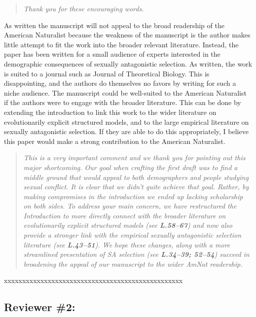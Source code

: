 \documentclass[11pt]{article}
\begin{document}
\begin{quote}
	{\itshape Thank you for these encouraging words.}
\end{quote}

As written the manuscript will not appeal to the broad readership of the American Naturalist because the weakness of the manuscript is the author makes little attempt to fit the work into the broader relevant literature. Instead, the paper has been written for a small audience of experts interested in the demographic consequences of sexually antagonistic selection. As written, the work is suited to a journal such as Journal of Theoretical Biology. This is disappointing, and the authors do themselves no favors by writing for such a niche audience. The manuscript could be well-suited to the American Naturalist if the authors were to engage with the broader literature. This can be done by extending the introduction to link this work to the wider literature on evolutionarily explicit structured models, and to the large empirical literature on sexually antagonistic selection. If they are able to do this appropriately, I believe this paper would make a strong contribution to the American Naturalist.

\begin{quote}
	{\itshape This is a very important comment and we thank you for pointing out this major shortcoming. Our goal when crafting the first draft was to find a middle ground that would appeal to both demographers and people studying sexual conflict. It is clear that we didn't quite achieve that goal. Rather, by making compromises in the introduction we ended up lacking scholarship on both sides. To address your main concern, we have restructured the Introduction to more directly connect with the broader literature on evolutionarily explicit structured models (see {\bf L.58--67}) and now also provide a stronger link with the empirical sexually antagonistic selection literature (see {\bf L.43--51}). We hope these changes, along with a more streamlined presentation of SA selection (see {\bf L.34--39; 52--54}) succeed in broadening the appeal of our manuscript to the wider AmNat readership.}
\end{quote}

\noindent xxxxxxxxxxxxxxxxxxxxxxxxxxxxxxxxxxxxxxxxxxxxxxxxx


\subsection*{Reviewer \#2:}
\end{document}
